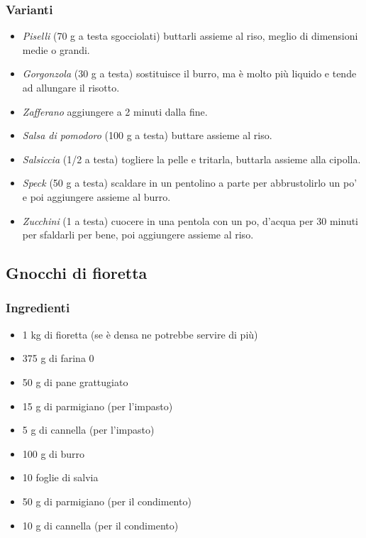 \documentclass[12pt, a4paper]{article}
\begin{document}
\clearpage
\subsubsection{Varianti}
\begin{itemize}
\item \emph{Piselli} (70 g a testa sgocciolati) buttarli assieme al riso,
	meglio di dimensioni medie o grandi.
\item \emph{Gorgonzola} (30 g a testa) sostituisce il burro, ma è molto
	più liquido e tende ad allungare il risotto.
\item \emph{Zafferano} aggiungere a 2 minuti dalla fine.
\item \emph{Salsa di pomodoro} (100 g a testa) buttare assieme al riso.
\item \emph{Salsiccia} (1/2 a testa) togliere la pelle e tritarla, buttarla 
	assieme	alla cipolla.
\item \emph{Speck} (50 g a testa) scaldare in un pentolino a parte per
	abbrustolirlo un po' e poi aggiungere assieme al burro.
\item \emph{Zucchini} (1 a testa) cuocere in una pentola con un po, d'acqua
	per 30 minuti per sfaldarli per bene, poi aggiungere 
	assieme	al riso.
\end{itemize}
\clearpage

\subsection{Gnocchi di fioretta}

\subsubsection{Ingredienti}
\begin{itemize}
\item	1 kg di fioretta (se è densa ne potrebbe servire di più)
\item	375 g di farina 0
\item 	50 g di pane grattugiato
\item 	15 g di parmigiano (per l'impasto)
\item 	5 g di cannella (per l'impasto)
\item	100 g di burro
\item	10 foglie di salvia
\item	50 g di parmigiano (per il condimento)
\item	10 g di cannella (per il condimento)
\end{itemize}
\end{document}
